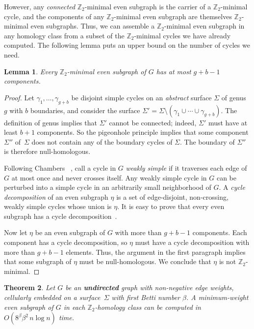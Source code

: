 \documentclass[twoside,leqno,twocolumn]{article}
\def\Z{\mathbb{Z}}
\newtheorem{theorem}{Theorem}[section]
\newtheorem{lemma}[theorem]{Lemma}
\begin{document}
{However, any \emph{connected} $\Z_2$-minimal even subgraph is the carrier of a $\Z_2$-minimal cycle, and the components of any $\Z_2$-minimal even subgraph are themselves $\Z_2$-minimal even subgraphs.  Thus, we can assemble a $\Z_2$-minimal even subgraph in any homology class from a subset of the $\Z_2$-minimal cycles we have already computed.  The following lemma puts an upper bound on the number of cycles we need.

\begin{lemma}
\label{L:even-comps}
Every $\Z_2$-minimal even subgraph of $G$ has at most $g+b-1$ components.
\end{lemma}

\begin{proof}
Let $\gamma_1, \dots, \gamma_{g+b}$ be disjoint simple cycles on an \emph{abstract} surface $\Sigma$ of genus $g$ with $b$ boundaries, and consider the surface $\Sigma' = \Sigma \setminus (\gamma_1 \cup \cdots \cup \gamma_{g+b})$.  The definition of genus implies that $\Sigma'$ cannot be connected; indeed, $\Sigma'$ must have at least $b+1$ components.  So the pigeonhole principle implies that some component $\Sigma''$ of~$\Sigma$ does not contain any of the boundary cycles of $\Sigma$.  The boundary of $\Sigma''$ is therefore null-homologous.

Following Chambers \etal~\cite{surfcut}, call a cycle in $G$ \emph{weakly simple} if it traverses each edge of $G$ at most once and never crosses itself.  Any weakly simple cycle in $G$ can be perturbed into a simple cycle in an arbitrarily small neighborhood of $G$.  A \emph{cycle decomposition} of an even subgraph $\eta$ is a set of edge-disjoint, non-crossing, weakly simple cycles whose union is $\eta$.  It is easy to prove that every even subgraph has a cycle decomposition~\cite[Lemma 3.2]{surfcut}.

Now let $\eta$ be an even subgraph of $G$ with more than $g+b-1$ components.  Each component has a cycle decomposition, so $\eta$ must have a cycle decomposition with more than $g+b-1$ elements.  Thus, the argument in the first paragraph implies that some subgraph of $\eta$ must be null-homologous.  We conclude that $\eta$ is not $\Z_2$-minimal.
\end{proof}

\begin{theorem}
\label{Th:min-even}
Let $G$ be an \textbf{undirected} graph with non-negative edge weights, cellularly embedded on a surface~$\Sigma$ with first Betti number $\beta$.  A minimum-weight even subgraph of $G$ in each $\Z_2$-homology class can be computed in $O(8^\beta \beta^2\, n\log n)$ time.
\end{theorem}

}
\end{document}
